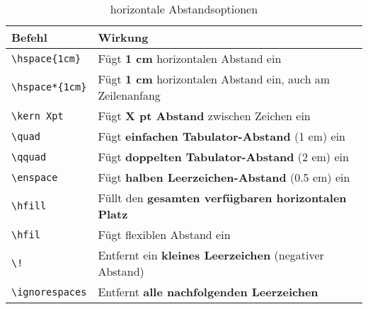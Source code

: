 \begin{table}[H]
    \centering
    \begin{tabular}{lp{10cm}}
        \toprule
        \textbf{Befehl}                        & \textbf{Wirkung}                                                  \\
        \midrule
        \texttt{\textbackslash hspace\{1cm\}}  & Fügt \textbf{1 cm} horizontalen Abstand ein                       \\
        \texttt{\textbackslash hspace*\{1cm\}} & Fügt \textbf{1 cm} horizontalen Abstand ein, auch am Zeilenanfang \\
        \texttt{\textbackslash kern Xpt}       & Fügt \textbf{X pt Abstand} zwischen Zeichen ein                   \\
        \texttt{\textbackslash quad}           & Fügt \textbf{einfachen Tabulator-Abstand} (1 em) ein              \\
        \texttt{\textbackslash qquad}          & Fügt \textbf{doppelten Tabulator-Abstand} (2 em) ein              \\
        \texttt{\textbackslash enspace}        & Fügt \textbf{halben Leerzeichen-Abstand} (0.5 em) ein             \\
        \texttt{\textbackslash hfill}          & Füllt den \textbf{gesamten verfügbaren horizontalen Platz}        \\
        \texttt{\textbackslash hfil}           & Fügt flexiblen Abstand ein                                        \\
        \midrule
        \texttt{\textbackslash !}              & Entfernt ein \textbf{kleines Leerzeichen} (negativer Abstand)     \\
        \texttt{\textbackslash ignorespaces}   & Entfernt \textbf{alle nachfolgenden Leerzeichen}                  \\
        \bottomrule
    \end{tabular}
    \caption{horizontale Abstandsoptionen}
    \label{tab:horizontale_abstaende}
\end{table}